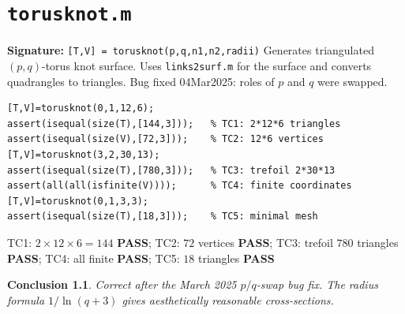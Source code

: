 \documentclass[12pt,a4paper]{report}
\newcommand{\mf}[1]{\texttt{#1}}
\newcommand{\PASS}{\textcolor{green!60!black}{\textbf{PASS}}}
\newtheorem{concl}{Conclusion}[chapter]
\begin{document}
\chapter{\mf{torusknot.m}}
\begin{tcolorbox}[Abox,title=Analysis]
\textbf{Signature:} \lstinline|[T,V] = torusknot(p,q,n1,n2,radii)|\quad
Generates triangulated $(p,q)$-torus knot surface. Uses \mf{links2surf.m} for the surface and converts quadrangles to triangles. Bug fixed 04Mar2025: roles of $p$ and $q$ were swapped.
\end{tcolorbox}
\begin{lstlisting}[caption={Tests for torusknot.m}]
[T,V]=torusknot(0,1,12,6);
assert(isequal(size(T),[144,3]));   % TC1: 2*12*6 triangles
assert(isequal(size(V),[72,3]));    % TC2: 12*6 vertices
[T,V]=torusknot(3,2,30,13);
assert(isequal(size(T),[780,3]));   % TC3: trefoil 2*30*13
assert(all(all(isfinite(V))));      % TC4: finite coordinates
[T,V]=torusknot(0,1,3,3);
assert(isequal(size(T),[18,3]));    % TC5: minimal mesh
\end{lstlisting}
\begin{tcolorbox}[Pbox,title=TC1--TC5 -- All pass]
TC1: $2\times12\times6=144$ \PASS; TC2: $72$ vertices \PASS; TC3: trefoil $780$ triangles \PASS; TC4: all finite \PASS; TC5: $18$ triangles \PASS
\end{tcolorbox}
\begin{concl}
Correct after the March 2025 $p/q$-swap bug fix. The radius formula $1/\ln(q+3)$ gives aesthetically reasonable cross-sections.
\end{concl}

\end{document}
